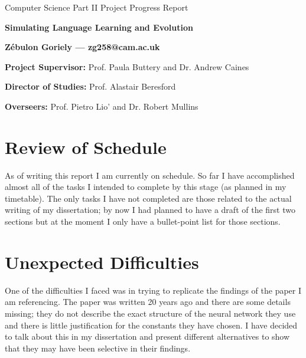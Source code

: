 \documentclass[12pt]{article}
\newcommand{\belgianspacing}{\frenchspacing}
\begin{document}
\belgianspacing

\thispagestyle{empty}



\centerline{\large Computer Science Part II Project Progress Report}
\vspace{0.1in}
\centerline{\Large\bf Simulating Language Learning and Evolution}
\vspace{0.1in}
\centerline{\large {\bf{Z\'ebulon Goriely ---  zg258@cam.ac.uk}}}
\vspace{0.1in}
\centerline{\large {}}
 
 \vspace{0.3in}
 

{\bf Project Supervisor:} {Prof. Paula Buttery and Dr. Andrew Caines}

{\bf Director of Studies:}  {Prof. Alastair Beresford}

{\bf Overseers:} {Prof. Pietro Lio’} and {Dr. Robert Mullins}

\section*{Review of Schedule}

As of writing this report I am currently on schedule. So far I have accomplished almost all of the tasks I intended to complete by this stage (as planned in my timetable). The only tasks I have not completed are those related to the actual writing of my dissertation; by now I had planned to have a draft of the first two sections but at the moment I only have a bullet-point list for those sections.

\section*{Unexpected Difficulties}

One of the difficulties I faced was in trying to replicate the findings of the paper I am referencing. The paper was written 20 years ago and there are some details missing; they do not describe the exact structure of the neural network they use and there is little justification for the constants they have chosen. I have decided to talk about this in my dissertation and present different alternatives to show that they may have been selective in their findings.
\end{document}
